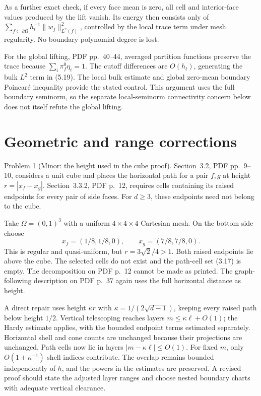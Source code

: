 \documentclass[10pt]{article}
\begin{document}
As a further exact check, if every face mean is zero, all cell and interior-face values produced by the lift vanish. Its energy then consists only of \(\sum_{f\subset\partial\Omega}h_t^{-1}\|w_f\|_{L^2(f)}^2\), controlled by the local trace term under mesh regularity. No boundary polynomial degree is lost.\par
For the global lifting, PDF pp. 40–44, averaged partition functions preserve the trace because \(\sum_i\pi_f^0\eta_i=1\). The cutoff differences are \(O(h_t)\), generating the bulk \(L^2\) term in (5.19). The local bulk estimate and global zero-mean boundary Poincaré inequality provide the stated control. This argument uses the full boundary seminorm, so the separate local-seminorm connectivity concern below does not itself refute the global lifting.\par
\section*{Geometric and range corrections}
Problem 1 (Minor: the height used in the cube proof).  Section 3.2, PDF pp. 9–10, considers a unit cube and places the horizontal path for a pair \(f,g\) at height \(r=|x_f-x_g|\). Section 3.3.2, PDF p. 12, requires cells containing its raised endpoints for every pair of side faces. For \(d\ge3\), these endpoints need not belong to the cube.\par
Take \(\Omega=(0,1)^3\) with a uniform \(4\times4\times4\) Cartesian mesh. On the bottom side choose \[x_f=(1/8,1/8,0),\qquad x_g=(7/8,7/8,0).\] This is regular and quasi-uniform, but \(r=3\sqrt2/4>1\). Both raised endpoints lie above the cube. The selected cells do not exist and the path-cell set (3.17) is empty. The decomposition on PDF p. 12 cannot be made as printed. The graph-following description on PDF p. 37 again uses the full horizontal distance as height.\par
A direct repair uses height \(\kappa r\) with \(\kappa=1/(2\sqrt{d-1})\), keeping every raised path below height \(1/2\). Vertical telescoping reaches layers \(m\le\kappa\ell+O(1)\); the Hardy estimate applies, with the bounded endpoint terms estimated separately. Horizontal shell and cone counts are unchanged because their projections are unchanged. Path cells now lie in layers \(|m-\kappa\ell|\le O(1)\). For fixed \(m\), only \(O(1+\kappa^{-1})\) shell indices contribute. The overlap remains bounded independently of \(h\), and the powers in the estimates are preserved. A revised proof should state the adjusted layer ranges and choose nested boundary charts with adequate vertical clearance.\par
\end{document}
